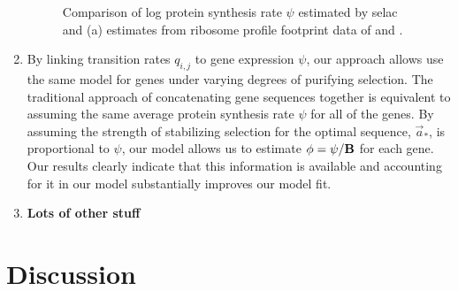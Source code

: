 \documentclass{article}
\newcommand{\Func}{\ensuremath{\text{\textbf{B}}}\xspace}
\newcommand{\aoptvec}{\ensuremath{\Vec{a}_*}\xspace}
\newcommand{\qij}{\ensuremath{q_{i,j}}\xspace}
\begin{document}
\begin{enumerate}
\begin{figure}[H]
\caption{Comparison of log protein synthesis rate $\psi$  estimated by selac and (a) estimates from ribosome profile footprint data of \citet{IngoliaEtAl2009} and \citet{HolstegeEtAl1998}.
}
\end{figure}
\item By linking transition rates $\qij$ to gene expression $\psi$, our approach allows use the same model for genes under varying degrees of purifying selection.
The traditional approach of concatenating gene sequences together is equivalent to assuming the same average protein synthesis rate $\psi$ for all of the genes.
By assuming the strength of stabilizing selection for the optimal sequence, \aoptvec, is proportional to $\psi$,  our model allows us to estimate $\phi = \psi/\Func$ for each gene.
Our results clearly indicate that this information is available and accounting for it in our model substantially improves our model fit.
\item \textbf{Lots of other stuff}
\end{enumerate}
\section*{Discussion}
\end{document}
